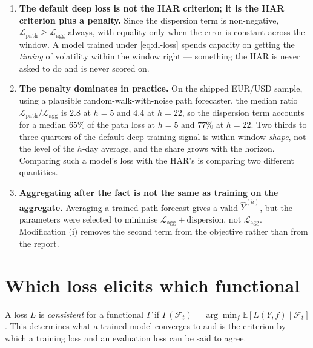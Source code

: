 \documentclass[11pt,a4paper]{article}
\newcommand{\E}{\mathbb{E}}
\newcommand{\Fset}{\mathcal{F}}
\newcommand{\Lpath}{\mathcal{L}_{\mathrm{path}}}
\newcommand{\Lagg}{\mathcal{L}_{\mathrm{agg}}}
\begin{document}
\begin{enumerate}
  \item \textbf{The default deep loss is not the HAR criterion; it is the HAR criterion plus
        a penalty.} Since the dispersion term is non-negative,
        $\Lpath\ge\Lagg$ always, with equality only when the error is constant across the
        window. A model trained under \eqref{eq:dl-loss} spends capacity on getting the
        \emph{timing} of volatility within the window right --- something the HAR is never
        asked to do and is never scored on.
  \item \textbf{The penalty dominates in practice.} On the shipped EUR/USD sample, using a
        plausible random-walk-with-noise path forecaster, the median ratio
        $\Lpath/\Lagg$ is $2.8$ at $h=5$ and $4.4$ at $h=22$, so the dispersion term
        accounts for a median $65\%$ of the path loss at $h=5$ and $77\%$ at $h=22$. Two
        thirds to three quarters of the default deep training signal is within-window
        \emph{shape}, not the level of the $h$-day average, and the share grows with the
        horizon. Comparing such a model's loss with the HAR's is comparing two different
        quantities.
  \item \textbf{Aggregating after the fact is not the same as training on the aggregate.}
        Averaging a trained path forecast gives a valid $\hat{Y}^{(h)}$, but the parameters
        were selected to minimise $\Lagg + \text{dispersion}$, not $\Lagg$. Modification (i)
        removes the second term from the objective rather than from the report.
\end{enumerate}

\section{Which loss elicits which functional}
\label{sec:consistency}

A loss $L$ is \emph{consistent} for a functional $\Gamma$ if
$\Gamma(\Fset_t)=\arg\min_{f}\E[L(Y,f)\mid\Fset_t]$. This determines what a trained model
converges to and is the criterion by which a training loss and an evaluation loss can be
said to agree.
\end{document}
